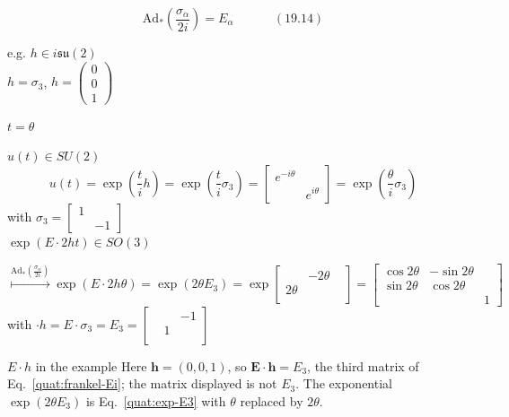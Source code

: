 \begin{equation}
  \text{Ad}_*\left( \frac{\sigma_{\alpha} }{ 2i } \right)  = E_{\alpha} \quad \quad \quad \, (19.14)
\end{equation}

e.g. $h \in i\mathfrak{su}(2)$ \\
\phantom{e.g. } $h = \sigma_3$, $h = \left( \begin{matrix} 0 \\ 0 \\ 1 \end{matrix} \right)$

$t=\theta$

$u(t) \in SU(2)$
\[
u(t) = \exp{ \left( \frac{t}{i} h \right)} = \exp{ \left( \frac{t}{i} \sigma_3 \right)} = \left[ \begin{matrix} e^{-i\theta}  & \\ & e^{i\theta} \end{matrix} \right] = \exp{ \left( \frac{\theta}{i} \sigma_3 \right)}
\]
with $\sigma_3 = \left[ \begin{matrix} 1 & \\ & -1 \end{matrix} \right]$ \\

$\exp{ (E\cdot 2ht )} \in SO(3)$ 

\[
\overset{\text{Ad}_*\left( \frac{\sigma_{\alpha} }{2i} \right) }{ \mapsto } \exp{ (E\cdot 2h\theta)} = \exp{ (2\theta E_3)} = \exp{ \left[ \begin{matrix} & -2\theta & \\ 2\theta & & \\ & & \end{matrix} \right] } = \left[ \begin{matrix} \cos{2\theta} & -\sin{2\theta} & \\ \sin{2\theta} & \cos{2\theta} & \\ & & 1 \end{matrix} \right]
\]
with $\cdot h = E\cdot \sigma_3 = E_3 = \left[ \begin{matrix} & & -1 \\ & 1 & \\ & & \end{matrix} \right]$

\begin{correction}{$E\cdot h$ in the example}
Here $\mathbf h=(0,0,1)$, so $\mathbf E\cdot\mathbf h=E_3$, the third matrix of Eq.~\eqref{quat:frankel-Ei}; the matrix displayed is not $E_3$. The exponential $\exp(2\theta E_3)$ is Eq.~\eqref{quat:exp-E3} with $\theta$ replaced by $2\theta$.
\end{correction}

